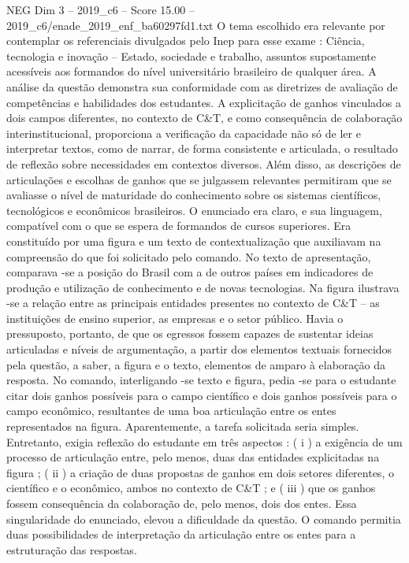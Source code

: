 \begin{textsample}{NEG Dim 3 – 2019\_c6 – Score 15.00 – 2019\_c6/enade\_2019\_enf\_ba60297fd1.txt}
O tema escolhido era relevante por contemplar os referenciais divulgados pelo Inep para esse exame : Ciência, tecnologia e inovação – Estado, sociedade e trabalho, assuntos supostamente acessíveis aos formandos do nível universitário brasileiro de qualquer área.
A análise da questão demonstra sua conformidade com as diretrizes de avaliação de competências e habilidades dos estudantes.
A explicitação de ganhos vinculados a dois campos diferentes, no contexto de C\&T, e como consequência de colaboração interinstitucional, proporciona a verificação da capacidade não só de ler e interpretar textos, como de narrar, de forma consistente e articulada, o resultado de reflexão sobre necessidades em contextos diversos.
Além disso, as descrições de articulações e escolhas de ganhos que se julgassem relevantes permitiram que se avaliasse o nível de maturidade do conhecimento sobre os sistemas científicos, tecnológicos e econômicos brasileiros.
O enunciado era claro, e sua linguagem, compatível com o que se espera de formandos de cursos superiores.
Era constituído por uma figura e um texto de contextualização que auxiliavam na compreensão do que foi solicitado pelo comando.
No texto de apresentação, comparava -se a posição do Brasil com a de outros países em indicadores de produção e utilização de conhecimento e de novas tecnologias.
Na figura ilustrava -se a relação entre as principais entidades presentes no contexto de C\&T – as instituições de ensino superior, as empresas e o setor público.
Havia o pressuposto, portanto, de que os egressos fossem capazes de sustentar ideias articuladas e níveis de argumentação, a partir dos elementos textuais fornecidos pela questão, a saber, a figura e o texto, elementos de amparo à elaboração da resposta.
No comando, interligando -se texto e figura, pedia -se para o estudante citar dois ganhos possíveis para o campo científico e dois ganhos possíveis para o campo econômico, resultantes de uma boa articulação entre os entes representados na figura.
Aparentemente, a tarefa solicitada seria simples.
Entretanto, exigia reflexão do estudante em três aspectos : ( i ) a exigência de um processo de articulação entre, pelo menos, duas das entidades explicitadas na figura ; ( ii ) a criação de duas propostas de ganhos em dois setores diferentes, o científico e o econômico, ambos no contexto de C\&T ; e ( iii ) que os ganhos fossem consequência da colaboração de, pelo menos, dois dos entes.
Essa singularidade do enunciado, elevou a dificuldade da questão.
O comando permitia duas possibilidades de interpretação da articulação entre os entes para a estruturação das respostas.

\end{textsample}
